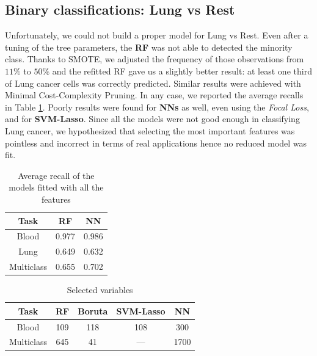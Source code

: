\documentclass[a4paper,11pt, oneside]{article}  %
\begin{document}
	
	\subsection{Binary classifications: Lung vs Rest}
Unfortunately,  we could not build a proper model for Lung vs Rest.  Even after a tuning of the tree parameters,  the \textbf{RF} was not able to detected the minority class.  Thanks to SMOTE, we adjusted the frequency of those observations from $11\%$ to $50\%$ and the refitted RF gave us a slightly better result: at least one third of Lung cancer cells was correctly predicted.  Similar results were achieved with Minimal Cost-Complexity Pruning.  In any case,  we reported the  average recalls in Table \ref{table:big_models}.  Poorly results were found for \textbf{NNs} as well,  even using the \textit{Focal Loss},  and for \textbf{SVM-Lasso}.  Since all the models were not good enough in classifying Lung cancer, we hypothesized that selecting the most important features was pointless and incorrect in terms of real applications hence no reduced model was fit.
	
	
	
	
	
	
	\begin{table}[h!]
		\caption{Average recall of the models fitted with all the features}
		\centering
		\begin{tabular}{c c c}
			\hline\hline
			Task & RF & NN \\ [0.5ex] %
			\hline
			Blood & 0.977  & 0.986 \\
			Lung & 0.649  & 0.632 \\
			Multiclass & 0.655 & 0.702 \\ [1ex]
			\hline
		\end{tabular}
		\label{table:big_models}
	\end{table}
	
	\begin{table}[h!]
		\caption{Selected variables}
		\centering
		\begin{tabular}{c c c c c}
			\hline\hline
			Task & RF & Boruta & SVM-Lasso & NN \\ [0.5ex] %
			\hline
			Blood & 109 & 118 & 108 & 300 \\
			Multiclass & 645 &  41 & --- & 1700 \\ [1ex]
			\hline
		\end{tabular}
		\label{table:selected variables}
	\end{table}
	
\end{document}
